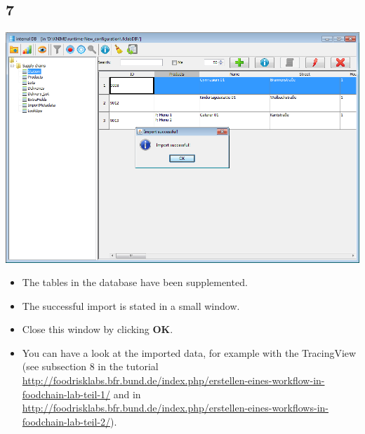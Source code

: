 \documentclass{beamer}
\begin{document}
\subsection{7}
\begin{frame}
	\begin{center}
  		\includegraphics[height=0.6\textheight]{7.png}
	\end{center}
	\begin{itemize}
		\item The tables in the database have been supplemented.
		\item The successful import is stated in a small window.
        \item Close this window by clicking \textbf{OK}.
        \item You can have a look at the imported data, for example with the TracingView (see subsection 8 in the tutorial \url{http://foodrisklabs.bfr.bund.de/index.php/erstellen-eines-workflow-in-foodchain-lab-teil-1/} and in \url{http://foodrisklabs.bfr.bund.de/index.php/erstellen-eines-workflows-in-foodchain-lab-teil-2/}).
	\end{itemize}
\end{frame}
\end{document}
